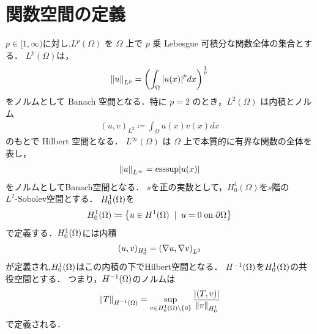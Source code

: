 \section{関数空間の定義}
\(p \in [1, \infty) \)に対し,\(L^p(\Omega)\) を 
\(\Omega\) 上で \(p\) 乗 Lebesgue 可積分な関数全体の集合とする．
\(L^p(\Omega)\)は，
\begin{align}
    \norm{u}_{L^p}=\qty(\int_\Omega\qty|u(x)|^p dx)^{\frac{1}{p}}
\end{align}
をノルムとして Banach 空間となる．特に \(p = 2\) のとき，\(L^2(\Omega)\) は内積とノルム
\begin{align}
    (u,v)_{L^2}\coloneqq\int_\Omega u(x) v(x)dx 
\end{align}
のもとで Hilbert 空間となる． 
\(L^\infty(\Omega)\) は \(\Omega\) 上で本質的に有界な関数の全体を表し，
\begin{align}
    \norm{u}_{L^\infty}=\text{ess}\mathrm{sup}|u(x)|
\end{align}
をノルムとしてBanach空間となる．
\(s\)を正の実数として，\(H^1_0(\Omega)\)を\(s\)階の\(L^2\text{-}\mathrm{Sobolev}\)空間とする．
\(H^1_0\qty(\Omega)\)を
\begin{align}
    H^1_0(\Omega) \coloneqq \qty{u\in H^1(\Omega)\;\;|\;\;u=0\;\text{on}\;\partial\Omega}
\end{align}
で定義する．\(H^1_0\qty(\Omega)\)には内積
\begin{align}
    (u,v)_{H^1_0}=\qty(\nabla u,\nabla v)_{L^2}
\end{align}
が定義され,\(H^1_0\qty(\Omega)\)はこの内積の下でHilbert空間となる．
\(H^{-1}\qty(\Omega)\)を\(H^1_0\qty(\Omega)\)の共役空間とする．
つまり，\(H^{-1}\qty(\Omega)\)のノルムは
\begin{align}
    \norm{T}_{H^{-1}\qty(\Omega)}
    = 
    \sup\limits_{v \in H^1_0\qty(\Omega) \backslash \{ 0 \} }
    \dfrac{\qty|( T,v )|}{\norm{v}_{H^1_0}}
\end{align}
で定義される．
